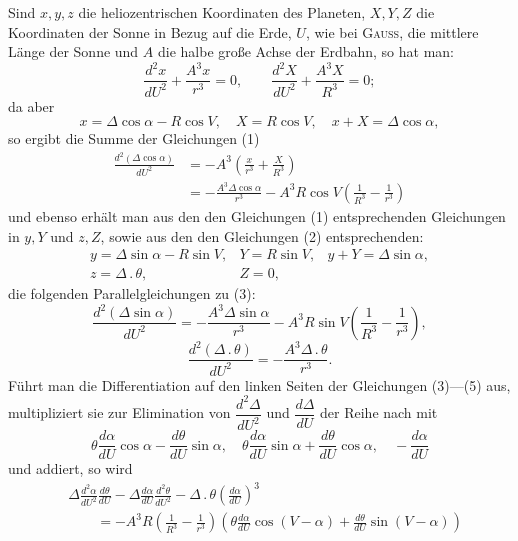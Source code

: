 Sind $x,y,z$ die heliozentrischen Koordinaten des Planeten, $X,Y,Z$ die Koordinaten der Sonne in Bezug auf die Erde, $U$, wie bei \textsc{Gauss}, die mittlere Länge der Sonne und $A$ die halbe große Achse der Erdbahn, so hat man:
\begin{equation*}
\frac{d^2x}{dU^2}+\frac{A^3x}{r^3}=0,\qquad
\frac{d^2X}{dU^2}+\frac{A^3X}{R^3}=0;\tag*{(1)}
\end{equation*}
\noindent da aber
\begin{equation*}
x=\Delta\cos\alpha-R\cos V,\quad X=R\cos V,\quad x+X=\Delta\cos\alpha,\tag*{(2)}
\end{equation*}
\noindent so ergibt die Summe der Gleichungen (1)
\begin{equation*}
\begin{aligned}
\frac{d^2(\Delta\cos\alpha)}{dU^2}&=-A^3\left(\frac{x}{r^3}+\frac{X}{R^3}\right)\\
&=-\frac{A^3\Delta\cos\alpha}{r^3}-A^3R\cos V\left(\frac1{R^3}-\frac1{r^3}\right)
\end{aligned}\tag*{(3)}
\end{equation*}
\noindent und ebenso erhält man aus den den Gleichungen (1) entsprechenden Gleichungen in $y,Y$ und $z,Z$, sowie aus den den Gleichungen (2) entsprechenden:
\[
\begin{array}{lll}
y=\Delta\sin\alpha-R\sin V,&Y=R\sin V,&y+Y=\Delta\sin\alpha,\\
z=\Delta\mathbin{.}\theta,&Z=0,
\end{array}
\]
\noindent die folgenden Parallelgleichungen zu (3):
\begin{equation*}
\frac{d^2(\Delta\sin\alpha)}{dU^2}=-\frac{A^3\Delta\sin\alpha}{r^3}-A^3R\sin V\left(\frac1{R^3}-\frac1{r^3}\right),\tag*{(4)}
\end{equation*}
\begin{equation*}
\frac{d^2(\Delta\mathbin{.}\theta)}{dU^2}=-\frac{A^3\Delta\mathbin{.}\theta}{r^3}.\tag*{(5)}
\end{equation*}
\clearpage
{}
Führt man die Differentiation auf den linken Seiten der Gleichungen (3)—(5) aus, multipliziert sie zur Elimination von $\dfrac{d^2\Delta}{dU^2}$ und $\dfrac{d\Delta}{dU}$ der Reihe nach mit
\[
\theta\frac{d\alpha}{dU}\cos\alpha-\frac{d\theta}{dU}\sin\alpha,\quad
\theta\frac{d\alpha}{dU}\sin\alpha+\frac{d\theta}{dU}\cos\alpha,\quad
-\frac{d\alpha}{dU}
\]
\noindent und addiert, so wird
\begin{equation*}
\begin{aligned}
&\Delta\frac{d^2\alpha}{dU^2}\frac{d\theta}{dU}-\Delta\frac{d\alpha}{dU}\frac{d^2\theta}{dU^2}-\Delta\mathbin{.}\theta\left(\frac{d\alpha}{dU}\right)^3\\
&\qquad=-A^3R\left(\frac1{R^3}-\frac1{r^3}\right)\left(\theta\frac{d\alpha}{dU}\cos(V-\alpha)+\frac{d\theta}{dU}\sin(V-\alpha)\right)
\end{aligned}\tag*{(6)}
\end{equation*}
